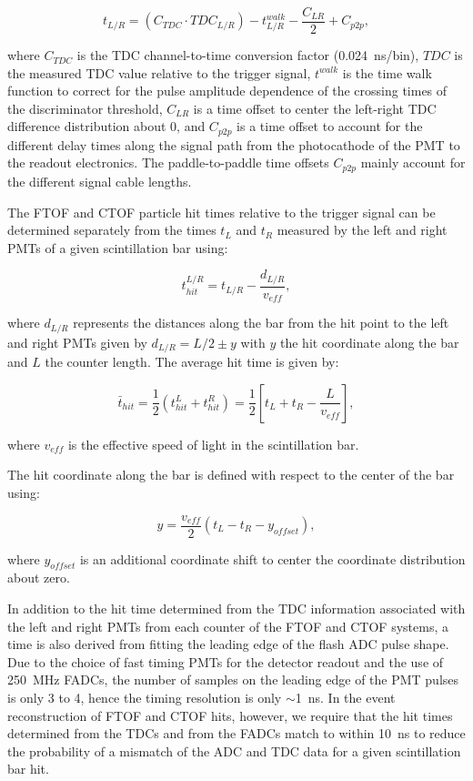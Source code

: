 \documentclass[3p,times,twocolumn]{elsarticle}
\begin{document}
\begin{equation}
t_{L/R} = (C_{TDC} \cdot TDC_{L/R}) - t_{L/R}^{walk} - \frac{C_{LR}}{2} + C_{p2p},
\end{equation}

\noindent
where $C_{TDC}$ is the TDC channel-to-time conversion factor (0.024~ns/bin), $TDC$ is the measured TDC value
relative to the trigger signal, $t^{walk}$ is the time walk function to correct for the pulse amplitude dependence of
the crossing times of the discriminator threshold, $C_{LR}$ is a time offset to center the left-right TDC difference
distribution about 0, and $C_{p2p}$ is a time offset to account for the different delay times along the signal path from
the photocathode of the PMT to the readout electronics. The paddle-to-paddle time offsets $C_{p2p}$ mainly account
for the different signal cable lengths.

The FTOF and CTOF particle hit times relative to the trigger signal can be determined separately from the times
$t_L$ and $t_R$ measured by the left and right PMTs of a given scintillation bar using:

\begin{equation}
t_{hit}^{L/R} = t_{L/R} - \frac{d_{L/R}}{v_{eff}},
\end{equation}

\noindent
where $d_{L/R}$ represents the distances along the bar from the hit point to the left and right PMTs given by
$d_{L/R}= L/2 \pm y$ with $y$ the hit coordinate along the bar and $L$ the counter length. The average hit time
is given by:

\begin{equation}
\bar{t}_{hit} = \frac{1}{2} ( t_{hit}^L + t_{hit}^R ) = \frac{1}{2} \left[ t_L + t_R - \frac{L}{v_{eff}} \right],
\end{equation}

\noindent
where $v_{eff}$ is the effective speed of light in the scintillation bar.

The hit coordinate along the bar is defined with respect to the center of the bar using:

\begin{equation}
\label{tof-coor}
y = \frac{v_{eff}}{2} (t_L - t_R - y_{offset}),
\end{equation}

\noindent
where $y_{offset}$ is an additional coordinate shift to center the coordinate distribution about zero.

In addition to the hit time determined from the TDC information associated with the left and right PMTs
from each counter of the FTOF and CTOF systems, a time is also derived from fitting the leading edge of
the flash ADC pulse shape. Due to the choice of fast timing PMTs for the detector readout and the use of
250~MHz FADCs, the number of samples on the leading edge of the PMT pulses is only 3 to 4, hence
the timing resolution is only $\sim$1~ns. In the event reconstruction of FTOF and CTOF hits, however, we
require that the hit times determined from the TDCs and from the FADCs match to within 10~ns to
reduce the probability of a mismatch of the ADC and TDC data for a given scintillation bar hit.
\end{document}
